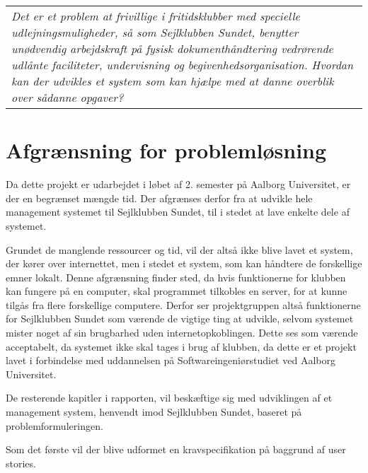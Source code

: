 \begin{center}
  \begin{tabular}{|p{14cm}|}
    \textit{Det er et problem at frivillige i fritidsklubber med specielle udlejningsmuligheder, så som Sejlklubben Sundet, benytter unødvendig arbejdskraft på fysisk dokumenthåndtering vedrørende udlånte faciliteter, undervisning og begivenhedsorganisation. 
    Hvordan kan der udvikles et system som kan hjælpe med at danne overblik over sådanne opgaver?}
  \end{tabular}
\end{center}


\section{Afgrænsning for problemløsning}

Da dette projekt er udarbejdet i løbet af 2. semester på Aalborg Universitet, er der en begrænset mængde tid.
Der afgrænses derfor fra at udvikle hele management systemet til Sejlklubben Sundet, til i stedet at lave enkelte dele af systemet.

Grundet de manglende ressourcer og tid, vil der altså ikke blive lavet et system, der kører over internettet, men i stedet et system, som kan håndtere de forskellige emner lokalt. 
Denne afgrænsning finder sted, da hvis funktionerne for klubben kan fungere på en computer, skal programmet tilkobles en server, for at kunne tilgås fra flere forskellige computere. 
Derfor ser projektgruppen altså funktionerne for Sejlklubben Sundet som værende de vigtige ting at udvikle, selvom systemet mister noget af sin brugbarhed uden internetopkoblingen.
Dette ses som værende acceptabelt, da systemet ikke skal tages i brug af klubben, da dette er et projekt lavet i forbindelse med uddannelsen på Softwareingeniørstudiet ved Aalborg Universitet.

De resterende kapitler i rapporten, vil beskæftige sig med udviklingen af et management system, henvendt imod Sejlklubben Sundet, baseret på problemformuleringen. 

Som det første vil der blive udformet en kravspecifikation på baggrund af user stories. 
